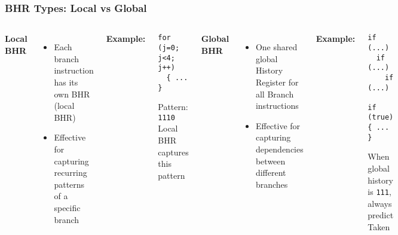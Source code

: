 \documentclass[aspectratio=169,12pt]{beamer}
\begin{document}
\begin{frame}[fragile]
  \frametitle{BHR Types: Local vs Global}

  \vspace{-0.3cm}
  \begin{columns}[t]
    \textbf{\large Local BHR}
    \vspace{0.3em}
    \begin{itemize}
      \item Each branch instruction has its own BHR (local BHR)
      \item Effective for capturing recurring patterns of a specific branch
    \end{itemize}

    \textbf{Example:}
    \begin{tcolorbox}[colback=green!5, colframe=green!40, boxrule=0.8pt]
      \small
\begin{verbatim}
for (j=0; j<4; j++)
  { ... }
\end{verbatim}
      \vspace{-0.5em}
      Pattern: \texttt{1110}\\
      Local BHR captures this pattern
    \end{tcolorbox}

    \textbf{\large Global BHR}
    \vspace{0.3em}
    \begin{itemize}
      \item One shared global History Register for all Branch instructions
      \item Effective for capturing dependencies between different branches
    \end{itemize}

    \textbf{Example:}
    \begin{tcolorbox}[colback=blue!5, colframe=blue!40, boxrule=0.8pt]
      \small
\begin{verbatim}
if (...)
  if (...)
    if (...)
      if (true) { ... }
\end{verbatim}
      \vspace{-0.5em}
      When global history is \texttt{111}, always predict Taken
    \end{tcolorbox}
  \end{columns}
\end{frame}
\end{document}
